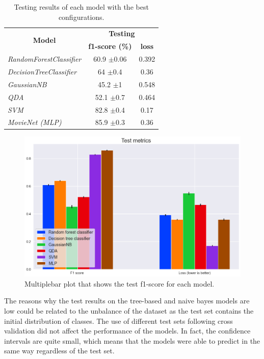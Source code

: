 \documentclass[../main]{subfiles}
\begin{document}
\begin{table}[!ht]
    \center
    \begin{tabular}{|l|cc|}
        \hline
        \multicolumn{1}{|c|}{\multirow{2}{*}{\textbf{Model}}} & \multicolumn{2}{c|}{\textbf{Testing}}               \\
        \cline{2-3} 
        \multicolumn{1}{|c|}{}                                & \multicolumn{1}{c|}{\textbf{f1-score (\%)}} & \textbf{loss}  \\ 
        \hline
        \textit{RandomForestClassifier}                       & \multicolumn{1}{c|}{60.9 $\pm$0.06}             & 0.392 \\
        \hline
        \textit{DecisionTreeClassifier}                       & \multicolumn{1}{c|}{64 $\pm$0.4}                & 0.36  \\
        \hline
        \textit{GaussianNB}                                   & \multicolumn{1}{c|}{45.2 $\pm$1}                & 0.548 \\
        \hline
        \textit{QDA}                                          & \multicolumn{1}{c|}{52.1 $\pm$0.7}              & 0.464 \\
        \hline
        \textit{SVM}                                          & \multicolumn{1}{c|}{82.8 $\pm$0.4}              & 0.17  \\
        \hline
        \textit{MovieNet (MLP)}                                     & \multicolumn{1}{c|}{85.9 $\pm$0.3}              & 0.36  \\ \hline
    \end{tabular}
    \caption{Testing results of each model with the best configurations.}
    \label{table:test_results}
\end{table}

\begin{figure}[!ht]
    \center
    \includegraphics[width=0.8\linewidth]{figures/test_metric_plot.png}
    \caption{Multiplebar plot that shows the test f1-score for each model.}
    \label{fig:test_metric_plot}
\end{figure}
\newpage

The reasons why the test results on the tree-based and naive bayes models are low could be related to the unbalance of the dataset as the test set contains the initial distribution of classes.
The use of different test sets following cross validation did not affect the performance of the models.
In fact, the confidence intervals are quite small, which means that the models were able to predict in the same way regardless of the test set.
\end{document}

